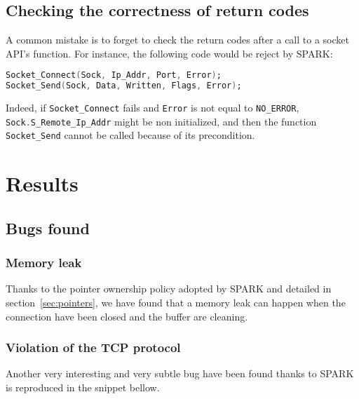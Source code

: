 \documentclass[conference]{IEEEtran}
\def\spark#1{\lstinline[language=Ada]{#1}}
\begin{document}
\subsection{Checking the correctness of return codes}

A common mistake is to forget to check the return codes after a call to a socket
API's function. For instance, the following code would be reject by SPARK:
\begin{lstlisting}[language=Ada,basicstyle=\small\ttfamily]
Socket_Connect(Sock, Ip_Addr, Port, Error);
Socket_Send(Sock, Data, Written, Flags, Error);
\end{lstlisting}
Indeed, if \spark{Socket_Connect} fails and \spark{Error} is not equal to
\spark{NO_ERROR}, \spark{Sock.S_Remote_Ip_Addr} might be non initialized, and
then the function \spark{Socket_Send} cannot be called because of its
precondition.

\section{Results}
\label{sec:results}

\subsection{Bugs found}

\subsubsection{Memory leak}

Thanks to the pointer ownership policy adopted by SPARK and detailed in
section~\ref{sec:pointers}, we have found that a memory leak can happen when
the connection have been closed and the buffer are cleaning.

\subsubsection{Violation of the TCP protocol}

Another very interesting and very subtle bug have been found thanks to SPARK is
reproduced in the snippet bellow.
\end{document}
